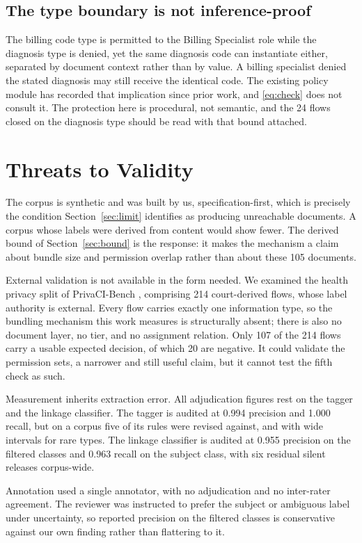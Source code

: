 \documentclass[conference]{IEEEtran}
\begin{document}
\subsection{The type boundary is not inference-proof}
The billing code type is permitted to the Billing Specialist role while the
diagnosis type is denied, yet the same diagnosis code can instantiate either,
separated by document context rather than by value. A billing specialist denied
the stated diagnosis may still receive the identical code. The existing policy
module has recorded that implication since prior work, and \eqref{eq:check} does
not consult it. The protection here is procedural, not semantic, and the 24
flows closed on the diagnosis type should be read with that bound attached.

\section{Threats to Validity}
\label{sec:threats}

The corpus is synthetic and was built by us, specification-first, which is
precisely the condition Section~\ref{sec:limit} identifies as producing
unreachable documents. A corpus whose labels were derived from content would
show fewer. The derived bound of Section~\ref{sec:bound} is the response: it
makes the mechanism a claim about bundle size and permission overlap rather than
about these 105 documents.

External validation is not available in the form needed. We examined the health
privacy split of PrivaCI-Bench \cite{b26}, comprising 214 court-derived flows,
whose label authority is external. Every flow carries exactly one information
type, so the bundling mechanism this work measures is structurally absent; there
is also no document layer, no tier, and no assignment relation. Only 107 of the
214 flows carry a usable expected decision, of which 20 are negative. It could
validate the permission sets, a narrower and still useful claim, but it cannot
test the fifth check as such.

Measurement inherits extraction error. All adjudication figures rest on the
tagger and the linkage classifier. The tagger is audited at 0.994 precision and
1.000 recall, but on a corpus five of its rules were revised against, and with
wide intervals for rare types. The linkage classifier is audited at 0.955
precision on the filtered classes and 0.963 recall on the subject class, with
six residual silent releases corpus-wide.

Annotation used a single annotator, with no adjudication and no inter-rater
agreement. The reviewer was instructed to prefer the subject or ambiguous label
under uncertainty, so reported precision on the filtered classes is conservative
against our own finding rather than flattering to it.
\end{document}
